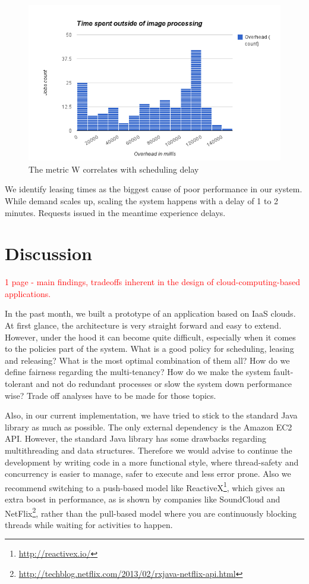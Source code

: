 \documentclass{stylesheet}
\begin{document}
\begin{figure}[b!]
	\centering
	\includegraphics[width=\linewidth]{overhead-const.png}
	\caption{The metric W correlates with scheduling delay}
	\label{fig:overhead-const}
\end{figure}

We identify leasing times as the biggest cause of poor performance in our system. While demand scales up, scaling the system happens with a delay of 1 to 2 minutes. Requests issued in the meantime experience delays.


\section{Discussion}
\label{sec:discussion}
\textcolor{red}{1 page - main findings, tradeoffs inherent in the design of cloud-computing-based applications.}

In the past month, we built a prototype of an application based on IaaS clouds. At first glance, the architecture is very straight forward and easy to extend. However, under the hood it can become quite difficult, especially when it comes to the policies part of the system. What is a good policy for scheduling, leasing and releasing? What is the most optimal combination of them all? How do we define fairness regarding the multi-tenancy? How do we make the system fault-tolerant and not do redundant processes or slow the system down performance wise? Trade off analyses have to be made for those topics.

Also, in our current implementation, we have tried to stick to the standard Java library as much as possible. The only external dependency is the Amazon EC2 API. However, the standard Java library has some drawbacks regarding multithreading and data structures. Therefore we would advise to continue the development by writing code in a more functional style, where thread-safety and concurrency is easier to manage, safer to execute and less error prone. Also we recommend switching to a push-based model like ReactiveX\footnote{\url{http://reactivex.io/}}, which gives an extra boost in performance, as is shown by companies like SoundCloud and NetFlix\footnote{\url{http://techblog.netflix.com/2013/02/rxjava-netflix-api.html}}, rather than the pull-based model where you are continuously blocking threads while waiting for activities to happen.
\end{document}
